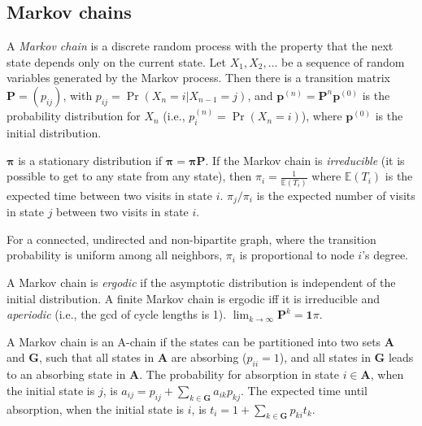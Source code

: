 \documentclass[11pt]{article}
\begin{document}
\begin{multicols}{3}
\section{Markov chains}
A \emph{Markov chain} is a discrete random process with the property that the next state depends only on the current state.
Let $X_1,X_2,\ldots$ be a sequence of random variables generated by the Markov process.
Then there is a transition matrix $\mathbf{P} = (p_{ij})$, with $p_{ij} = \Pr(X_n = i | X_{n-1} = j)$,
and $\mathbf{p}^{(n)} = \mathbf P^n \mathbf p^{(0)}$ is the probability distribution for $X_n$ (i.e., $p^{(n)}_i = \Pr(X_n = i)$),
where $\mathbf{p}^{(0)}$ is the initial distribution.

$\mathbf{\pi}$ is a stationary distribution if $\mathbf{\pi} = \mathbf{\pi P}$.
If the Markov chain is \emph{irreducible} (it is possible to get to any state from any state),
then $\pi_i = \frac{1}{\mathbb{E}(T_i)}$ where $\mathbb{E}(T_i)$  is the expected time between two visits in state $i$.
$\pi_j/\pi_i$ is the expected number of visits in state $j$ between two visits in state $i$.

For a connected, undirected and non-bipartite graph, where the transition probability is uniform among all neighbors, $\pi_i$ is proportional to node $i$'s degree.

A Markov chain is \emph{ergodic} if the asymptotic distribution is independent of the initial distribution.
A finite Markov chain is ergodic iff it is irreducible and \emph{aperiodic} (i.e., the gcd of cycle lengths is 1).
$\lim_{k\rightarrow\infty}\mathbf{P}^k = \mathbf{1}\pi$.

A Markov chain is an A-chain if the states can be partitioned into two sets $\mathbf{A}$ and $\mathbf{G}$, such that all states in $\mathbf{A}$ are absorbing ($p_{ii}=1$), and all states in $\mathbf{G}$ leads to an absorbing state in $\mathbf{A}$.
The probability for absorption in state $i\in\mathbf{A}$, when the initial state is $j$, is $a_{ij} = p_{ij}+\sum_{k\in\mathbf{G}} a_{ik}p_{kj}$.
The expected time until absorption, when the initial state is $i$, is $t_i = 1+\sum_{k\in\mathbf{G}}p_{ki}t_k$.

\end{multicols}
%
%
\end{document}
